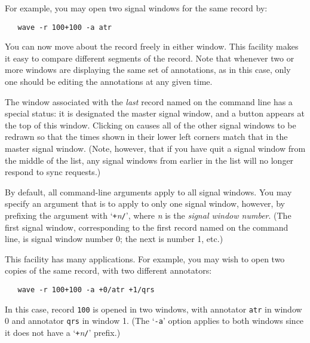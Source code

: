 \documentclass[twoside]{book}
\newcommand{\button}[1]{\cornersize{2}\ovalbox{\rule[-.3mm]{0cm}{2.5mm}\small\sf ~#1~}}
\begin{document}
For example, you may open two signal windows for the same record by:
\begin{verbatim}
   wave -r 100+100 -a atr
\end{verbatim}
You can now move about the record freely in either window.  This facility
makes it easy to compare different segments of the record.
Note that whenever two or more windows are displaying the same set of
annotations, as in this case, only one should be editing the
annotations at any given time.

The window associated with the \emph{last} record named on the command
line has a special status: it is designated the master signal window,
and a \button{Sync} button appears at the top of this
window.  Clicking on \button{Sync} causes all of the other signal
windows to be redrawn so that the times shown in their lower left
corners match that in the master signal window.  (Note, however, that
if you have quit a signal window from the middle of the list, any
signal windows from earlier in the list will no longer respond to sync
requests.)

By default, all command-line arguments apply to all signal windows.
You may specify an argument that is to apply to only one signal
window, however, by prefixing the argument with `{\tt +}{\it n}{\tt /}', where
{\it n} is the \emph{signal window number}.  (The first signal window,
corresponding to the first record named on the command line, is signal
window number 0; the next is number 1, etc.)

This facility has many applications.  For example, you may wish to open two
copies of the same record, with two different annotators:
\begin{verbatim}
   wave -r 100+100 -a +0/atr +1/qrs
\end{verbatim}
In this case, record {\tt 100} is opened in two windows, with annotator
{\tt atr} in window 0 and annotator {\tt qrs} in window 1.  (The
`{\tt -a}' option applies to both windows since it does not have a
`{\tt +}{\it n}{\tt /}' prefix.)
\end{document}
